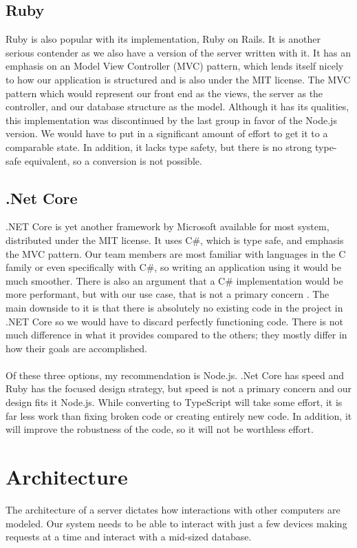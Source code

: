 \documentclass[draftclsnofoot,onecolumn,10pt]{IEEEtran}
\begin{document}
        \subsection{Ruby}
            Ruby is also popular with its implementation, Ruby on Rails. It is another serious contender as we also have a version of the server written with it. It has an emphasis on an Model View Controller (MVC) pattern, which lends itself nicely to how our application is structured and is also under the MIT license. The MVC pattern which would represent our front end as the views, the server as the controller, and our database structure as the model. Although it has its qualities, this implementation was discontinued by the last group in favor of the Node.js version. We would have to put in a significant amount of effort to get it to a comparable state. In addition, it lacks type safety, but there is no strong type-safe equivalent, so a conversion is not possible.
        \subsection{.Net Core}
           .NET Core is yet another framework by Microsoft available for most system, distributed under the MIT license. It uses C\#, which is type safe, and emphasis the MVC pattern. Our team members are most familiar with languages in the C family or even specifically with C\#, so writing an application using it would be much smoother. There is also an argument that a C\# implementation would be more performant, but with our use case, that is not a primary concern \cite{dotnet}. The main downside to it is that there is absolutely no existing code in the project in .NET Core so we would have to discard perfectly functioning code. There is not much difference in what it provides compared to the others; they mostly differ in how their goals are accomplished.
\\\\
           \indent Of these three options, my recommendation is Node.js. .Net Core has speed and Ruby has the focused design strategy, but speed is not a primary concern and our design fits it Node.js. While converting to TypeScript will take some effort, it is far less work than fixing broken code or creating entirely new code. In addition, it will improve the robustness of the code, so it will not be worthless effort.

    \break

	\section{Architecture}
        The architecture of a server dictates how interactions with other computers are modeled. Our system needs to be able to interact with just a few devices making requests at a time and interact with a mid-sized database.
\end{document}
